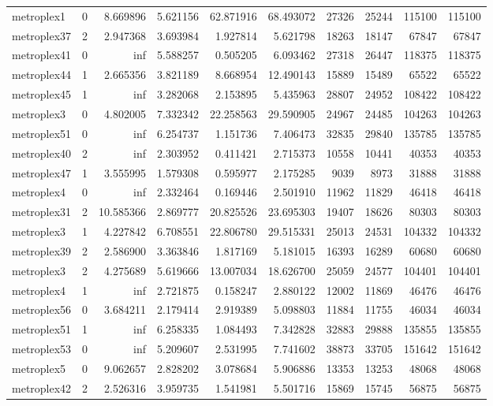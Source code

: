 \begin{longtable}{|l|r|r|r|r|r|r|r|r|r|}
metroplex1 & 0 & 8.669896 & 5.621156 & 62.871916 & 68.493072 & 27326 & 25244 & 115100 & 115100 \\
metroplex37 & 2 & 2.947368 & 3.693984 & 1.927814 & 5.621798 & 18263 & 18147 & 67847 & 67847 \\
metroplex41 & 0 & inf & 5.588257 & 0.505205 & 6.093462 & 27318 & 26447 & 118375 & 118375 \\
metroplex44 & 1 & 2.665356 & 3.821189 & 8.668954 & 12.490143 & 15889 & 15489 & 65522 & 65522 \\
metroplex45 & 1 & inf & 3.282068 & 2.153895 & 5.435963 & 28807 & 24952 & 108422 & 108422 \\
metroplex3 & 0 & 4.802005 & 7.332342 & 22.258563 & 29.590905 & 24967 & 24485 & 104263 & 104263 \\
metroplex51 & 0 & inf & 6.254737 & 1.151736 & 7.406473 & 32835 & 29840 & 135785 & 135785 \\
metroplex40 & 2 & inf & 2.303952 & 0.411421 & 2.715373 & 10558 & 10441 & 40353 & 40353 \\
metroplex47 & 1 & 3.555995 & 1.579308 & 0.595977 & 2.175285 & 9039 & 8973 & 31888 & 31888 \\
metroplex4 & 0 & inf & 2.332464 & 0.169446 & 2.501910 & 11962 & 11829 & 46418 & 46418 \\
metroplex31 & 2 & 10.585366 & 2.869777 & 20.825526 & 23.695303 & 19407 & 18626 & 80303 & 80303 \\
metroplex3 & 1 & 4.227842 & 6.708551 & 22.806780 & 29.515331 & 25013 & 24531 & 104332 & 104332 \\
metroplex39 & 2 & 2.586900 & 3.363846 & 1.817169 & 5.181015 & 16393 & 16289 & 60680 & 60680 \\
metroplex3 & 2 & 4.275689 & 5.619666 & 13.007034 & 18.626700 & 25059 & 24577 & 104401 & 104401 \\
metroplex4 & 1 & inf & 2.721875 & 0.158247 & 2.880122 & 12002 & 11869 & 46476 & 46476 \\
metroplex56 & 0 & 3.684211 & 2.179414 & 2.919389 & 5.098803 & 11884 & 11755 & 46034 & 46034 \\
metroplex51 & 1 & inf & 6.258335 & 1.084493 & 7.342828 & 32883 & 29888 & 135855 & 135855 \\
metroplex53 & 0 & inf & 5.209607 & 2.531995 & 7.741602 & 38873 & 33705 & 151642 & 151642 \\
metroplex5 & 0 & 9.062657 & 2.828202 & 3.078684 & 5.906886 & 13353 & 13253 & 48068 & 48068 \\
metroplex42 & 2 & 2.526316 & 3.959735 & 1.541981 & 5.501716 & 15869 & 15745 & 56875 & 56875 \\

\end{longtable}
